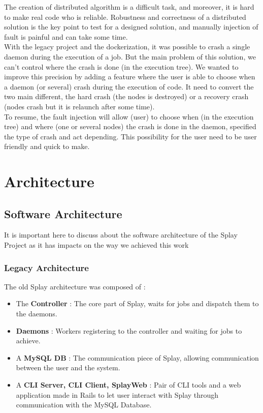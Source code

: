 \documentclass{eplmastersthesis}
\begin{document}
The creation of distributed algorithm is a difficult task, and moreover, it is hard to make real code who is reliable. Robustness and correctness of a distributed solution is the key point to test for a designed solution, and manually injection of fault is painful and can take some time. \\

With the legacy project and the dockerization, it was possible to crash a single daemon during the execution of a job. But the main problem of this solution, we can't control where the crash is done (in the execution tree). We wanted to improve this precision by adding a feature where the user is able to choose when a daemon (or several) crash during the execution of code. It need to convert the two main different, the hard crash (the nodes is destroyed) or a recovery crash (nodes crash but it is relaunch after some time). \\ 

To resume, the fault injection will allow (user) to choose when (in the execution tree) and where (one or several nodes) the crash is done in the daemon, specified the type of crash and act depending. This possibility for the user need to be user friendly and quick to make.


  \chapter{Architecture}

    \section{Software Architecture}

      It is important here to discuss about the software architecture of the
      Splay Project as it has impacts on the way we achieved this work

      \subsection{Legacy Architecture}

        The old Splay architecture was composed of :

        \begin{itemize}
          \item The \textbf{Controller} : The core part of Splay, waits for jobs
          and dispatch them to the daemons.
          \item \textbf{Daemons} : Workers registering to the controller and waiting
          for jobs to achieve.
          \item A \textbf{MySQL DB} : The communication piece of Splay, allowing
          communication between the user and the system.
          \item A \textbf{CLI Server, CLI Client, SplayWeb} : Pair of CLI tools
          and a web application made in Rails to let user interact with
          Splay through communication with the MySQL Database.
        \end{itemize}
\end{document}
